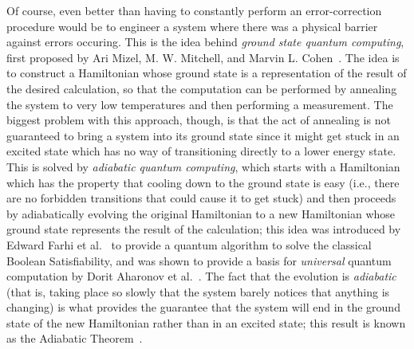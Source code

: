 \documentclass[12pt]{amsbook}
\theoremstyle{plain}
\theoremstyle{definition}
\theoremstyle{remark}
\begin{document}
Of course, even better than having to constantly perform an error-correction procedure would be to engineer a system where there was a physical barrier against errors occuring.  This is the idea behind \emph{ground state quantum computing}, first proposed by Ari Mizel, M. W. Mitchell, and Marvin L. Cohen~\cite{PhysRevA.63.040302}.  The idea is to construct a Hamiltonian whose ground state is a representation of the result of the desired calculation, so that the computation can be performed by annealing the system to very low temperatures and then performing a measurement.  The biggest problem with this approach, though, is that the act of annealing is not guaranteed to bring a system into its ground state since it might get stuck in an excited state which has no way of transitioning directly to a lower energy state.  This is solved by \emph{adiabatic quantum computing}, which starts with a Hamiltonian which has the property that cooling down to the ground state is easy (i.e., there are no forbidden transitions that could cause it to get stuck) and then proceeds by adiabatically evolving the original Hamiltonian to a new Hamiltonian whose ground state represents the result of the calculation;  this idea was introduced by Edward Farhi et al.~\cite{Farhi2000} to provide a quantum algorithm to solve the classical Boolean Satisfiability, and was shown to provide a basis for \emph{universal} quantum computation by Dorit Aharonov et al.~\cite{Aharonov2007}.  The fact that the evolution is \emph{adiabatic} (that is, taking place so slowly that the system barely notices that anything is changing) is what provides the guarantee that the system will end in the ground state of the new Hamiltonian rather than in an excited state;  this result is known as the Adiabatic Theorem~\cite{JPSJ.5.435}.
\end{document}
